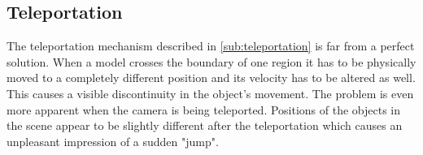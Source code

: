 \subsection{Teleportation}
The teleportation mechanism described in \autoref{sub:teleportation} is far from a perfect solution.
When a model crosses the boundary of one region it has to be physically moved to a completely different position and its velocity has to be altered as well.
This causes a visible discontinuity in the object's movement.
The problem is even more apparent when the camera is being teleported.
Positions of the objects in the scene appear to be slightly different after the teleportation which causes an unpleasant impression of a sudden "jump".
